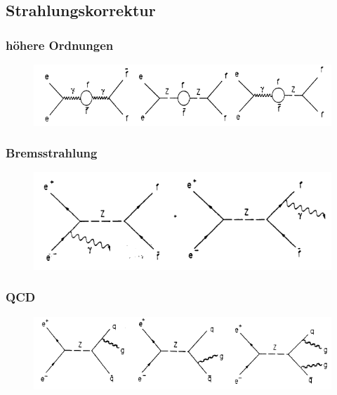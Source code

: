 \subsection{Strahlungskorrektur}
\begin{frame}
	\frametitle{höhere Ordnungen}
	\begin{figure}
		\begin{center}
			\includegraphics[width=1.0\linewidth]{graphics/vertexschleifen}
		\end{center}
	\end{figure}
\end{frame}
 \begin{frame}
 	\frametitle{Bremsstrahlung}
 	\begin{figure}
 		\begin{center}
 			\includegraphics[width=1.0\textwidth]{graphics/Bremsstrahlungskorrektur}
 		\end{center}
 	\end{figure}
 \end{frame}
\begin{frame}
	\frametitle{QCD}
	\begin{figure}
		\begin{center}
			\includegraphics[width=1.0\linewidth]{graphics/QCDkorrektur}
		\end{center}
	\end{figure}
\end{frame}


